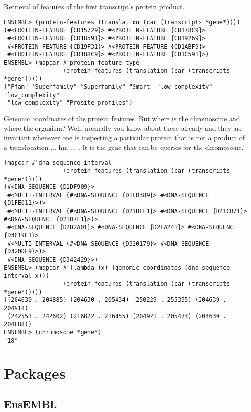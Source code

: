 \documentclass{book}
\newcommand\ensembl{EnsEMBL }
\begin{document}
Retrieval of features of the first transcript's protein product.

\begin{lstlisting}
ENSEMBL> (protein-features (translation (car (transcripts *gene*))))
(#<PROTEIN-FEATURE {CD15729}> #<PROTEIN-FEATURE {CD178C9}>
 #<PROTEIN-FEATURE {CD18591}> #<PROTEIN-FEATURE {CD19269}>
 #<PROTEIN-FEATURE {CD19F31}> #<PROTEIN-FEATURE {CD1ABF9}>
 #<PROTEIN-FEATURE {CD1B8C9}> #<PROTEIN-FEATURE {CD1C591}>)
ENSEMBL> (mapcar #'protein-feature-type
                 (protein-features (translation (car (transcripts *gene*)))))
("Pfam" "Superfamily" "Superfamily" "Smart" "low_complexity" "low_complexity"
 "low_complexity" "Prosite_profiles")
\end{lstlisting}

Genomic coordinates of the protein features. But where is the chromosome
and where the organism? Well, normally you know about these already and they
are invariant whenever one is inspecting a particular protein that is not
a product of a translocation $\ldots$ hm $\ldots$ . It is the gene that can
be queries for the chromosome.

\begin{lstlisting}
(mapcar #'dna-sequence-interval
                 (protein-features (translation (car (transcripts *gene*)))))
(#<DNA-SEQUENCE {D1DF909}>
 #<MULTI-INTERVAL (#<DNA-SEQUENCE {D1FD389}> #<DNA-SEQUENCE {D1FE011}>)>
 #<MULTI-INTERVAL (#<DNA-SEQUENCE {D21BEF1}> #<DNA-SEQUENCE {D21CB71}> #<DNA-SEQUENCE {D21D7F1}>)>
 #<DNA-SEQUENCE {D2D2A01}> #<DNA-SEQUENCE {D2EA241}> #<DNA-SEQUENCE {D3019E1}>
 #<MULTI-INTERVAL (#<DNA-SEQUENCE {D320179}> #<DNA-SEQUENCE {D320DF9}>)>
 #<DNA-SEQUENCE {D342429}>)
ENSEMBL> (mapcar #'(lambda (x) (genomic-coordinates (dna-sequence-interval x)))
                 (protein-features (translation (car (transcripts *gene*)))))
((204639 . 204885) (204630 . 205434) (250229 . 255355) (204639 . 204918)
 (242551 . 242602) (216822 . 216855) (204921 . 205473) (204639 . 204888))
ENSEMBL> (chromosome *gene*)
"18"

\end{lstlisting}

\chapter{Packages}

\section{\ensembl}
\end{document}
